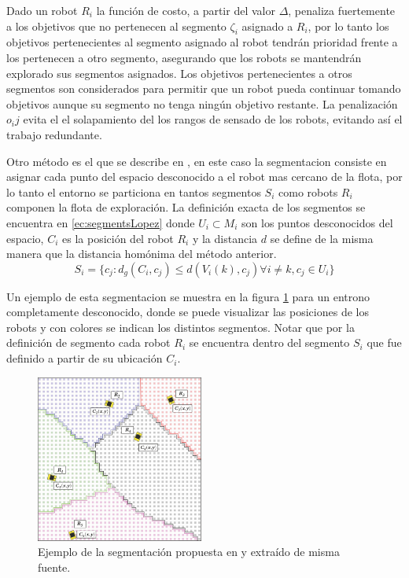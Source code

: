 Dado un robot $R_i$ la función de costo, a partir del valor $\Delta$, penaliza fuertemente a los objetivos que no pertenecen al segmento $\zeta_i$ asignado a $R_i$, por lo tanto los objetivos pertenecientes al segmento asignado al robot tendrán prioridad frente a los pertenecen a otro segmento, asegurando que los robots se mantendrán explorado sus segmentos asignados. Los objetivos pertenecientes a otros segmentos son considerados para permitir que un robot pueda continuar tomando objetivos aunque su segmento no tenga ningún objetivo restante. La penalización $o_ij$ evita el el solapamiento del los rangos de sensado de los robots, evitando así el trabajo redundante.\medbreak

Otro método es el que se describe en \cite{Lopez-Perez2018}, en este caso la segmentacion consiste en asignar cada punto del espacio desconocido a el robot mas cercano de la flota, por lo tanto el entorno se particiona en tantos segmentos $S_i$ como robots $R_i$ componen la flota de exploración. La definición exacta de los segmentos se encuentra en \eqref{ec:segmentsLopez} donde $U_i \subset M_i$ son los puntos desconocidos del espacio, $C_i$ es la posición del robot $R_i$ y la distancia $d$ se define de la misma manera que la distancia homónima del método anterior.
\begin{equation}\label{ec:segmentsLopez}
  S_i=\{c_j:d_g(C_i,c_j)\leq d(V_i(k),c_j) \forall i \neq k , c_j \in U_i\}
\end{equation}


Un ejemplo de esta segmentacion se muestra en la figura \ref{fig:ejemploCoordCenter} para un entrono completamente desconocido, donde se puede visualizar las posiciones de los robots y con colores se indican los distintos segmentos. Notar que por la definición de segmento cada robot $R_i$ se encuentra dentro del segmento $S_i$ que fue definido a partir de su ubicación $C_i$. %

\begin{figure}[H]
  \center
  \includegraphics[width=5.5cm]{imagenes/centerCoord.png}
  \caption{Ejemplo de la segmentación propuesta en \cite{Lopez-Perez2018} y extraído de misma fuente.}\label{fig:ejemploCoordCenter}
\end{figure} 

